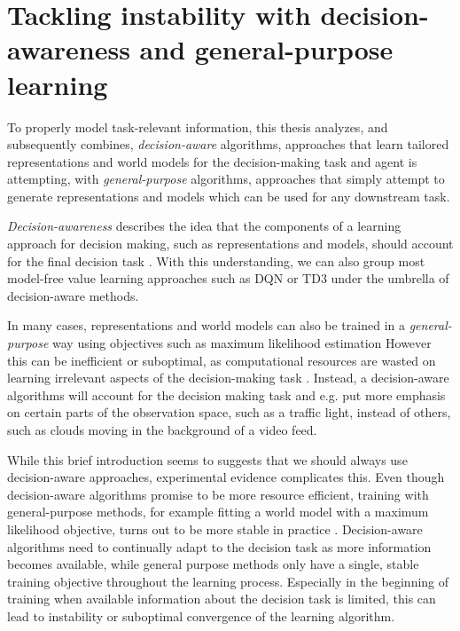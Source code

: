 \section{Tackling instability with decision-awareness and general-purpose learning}


To properly model task-relevant information, this thesis analyzes, and subsequently combines, \emph{decision-aware} algorithms, approaches that learn tailored representations and world models for the decision-making task and agent is attempting, with \emph{general-purpose} algorithms, approaches that simply attempt to generate representations and models which can be used for any downstream task.

\emph{Decision-awareness} describes the idea that the components of a learning approach for decision making, such as representations and models, should account for the final decision task \parencite{vaml,grimm2020value,abachi2020policy,nikishin2021control}.
With this understanding, we can also group most model-free value learning approaches such as DQN \parencite{mnih2013playing} or TD3 \parencite{fujimoto2018addressing} under the umbrella of decision-aware methods.

In many cases, representations and world models can also be trained in a \emph{general-purpose} way using objectives such as maximum likelihood estimation
However this can be inefficient or suboptimal, as computational resources are wasted on learning irrelevant aspects of the decision-making task \parencite{vaml}.
Instead, a decision-aware algorithms will account for the decision making task and e.g. put more emphasis on certain parts of the observation space, such as a traffic light, instead of others, such as clouds moving in the background of a video feed.

While this brief introduction seems to suggests that we should always use decision-aware approaches, experimental evidence complicates this.
Even though decision-aware algorithms promise to be more resource efficient, training with general-purpose methods, for example fitting a world model with a maximum likelihood objective, turns out to be more stable in practice \parencite{lovatto2020decision,voelcker2022value}.
Decision-aware algorithms need to continually adapt to the decision task as more information becomes available, while general purpose methods only have a single, stable training objective throughout the learning process.
Especially in the beginning of training when available information about the decision task is limited, this can lead to instability or suboptimal convergence of the learning algorithm.

